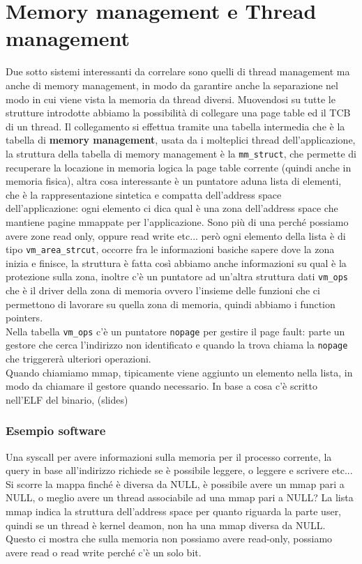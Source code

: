 \documentclass[12pt, oneside]{extbook}
\begin{document}
\section{Memory management e Thread management} 
Due sotto sistemi interessanti da correlare sono quelli di thread management ma anche di memory management, in modo da garantire anche la separazione nel modo in cui viene vista la memoria da thread diversi. Muovendosi su tutte le strutture introdotte abbiamo la possibilità di collegare una page table ed il TCB di un thread. Il collegamento si effettua tramite una tabella intermedia che è la tabella di \textbf{memory management}, usata da i molteplici thread dell'applicazione, la struttura della tabella di memory management è la \texttt{mm\_struct}, che permette di recuperare la locazione in memoria logica la page table corrente (quindi anche in memoria fisica), altra cosa interessante è un puntatore aduna lista di elementi, che è la rappresentazione sintetica e compatta dell'address space dell'applicazione: ogni elemento ci dica qual è una zona dell'address space che mantiene pagine mmappate per l'applicazione. Sono più di una perché possiamo avere zone read only, oppure read write etc... però ogni elemento della lista è di tipo \texttt{vm\_area\_strcut}, occorre fra le informazioni basiche sapere dove la zona inizia e finisce, la struttura è fatta così
abbiamo anche informazioni su qual è la protezione sulla zona, inoltre c'è un puntatore ad un'altra struttura dati \texttt{vm\_ops} che è il driver della zona di memoria ovvero l'insieme delle funzioni che ci permettono di lavorare su quella zona di memoria, quindi abbiamo i function pointers.\\Nella tabella \texttt{vm\_ops} c'è un puntatore \texttt{nopage} per gestire il page fault: parte un gestore che cerca l'indirizzo non identificato e quando la trova chiama la \texttt{nopage} che triggererà ulteriori operazioni.\\Quando chiamiamo mmap, tipicamente viene aggiunto un elemento nella lista, in modo da chiamare il gestore quando necessario. In base a cosa c'è scritto nell'ELF del binario, (slides)
\subsubsection*{Esempio software}
Una syscall per avere informazioni sulla memoria per il processo corrente, la query in base all'indirizzo richiede se è possibile leggere, o leggere e scrivere etc...\\Si scorre la mappa finché è diversa da NULL, è possibile avere un mmap pari a NULL, o meglio avere un thread associabile ad una mmap pari a NULL? La lista mmap indica la struttura dell'address space per quanto riguarda la parte user, quindi se un thread è kernel deamon, non ha una mmap diversa da NULL. Questo ci mostra che sulla memoria non possiamo avere read-only, possiamo avere read o read write perché c'è un solo bit.
\end{document}
